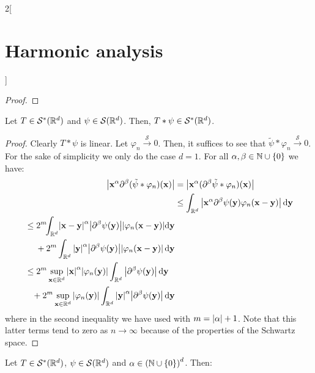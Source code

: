 \documentclass[../../../main_math.tex]{subfiles}
\begin{document}
\begin{multicols}{2}[\section{Harmonic analysis}]
\begin{proof}
  \end{proof}
  \begin{lemma}
    Let $T\in \mathcal{S}^*(\mathbb{R}^d)$ and $\psi\in \mathcal{S}(\mathbb{R}^d)$. Then, $T*\psi\in \mathcal{S}^*(\mathbb{R}^d)$.
  \end{lemma}
  \begin{proof}
    Clearly $T*\psi$ is linear. Let $\varphi_n\overset{\mathcal{S}}{\longrightarrow}0$. Then, it suffices to see that $\tilde\psi*\varphi_n\overset{\mathcal{S}}{\longrightarrow}0$. For the sake of simplicity we only do the case $d=1$. For all $\alpha,\beta\in{\ensuremath{\mathbb{N}}\cup\{0\}}$ we have:
    \begin{align*}
      \abs{\boldsymbol{\mathrm{x}}^\alpha \partial^\beta(\tilde\psi*\varphi_n)(\boldsymbol{\mathrm{x}})} & =\abs{\boldsymbol{\mathrm{x}}^\alpha (\partial^\beta\tilde\psi*\varphi_n)(\boldsymbol{\mathrm{x}})}                                                                 \\
                                                                       & \leq \int_{\mathbb{R}^d} \abs{\boldsymbol{\mathrm{x}}^\alpha \partial^\beta\psi(\boldsymbol{\mathrm{y}})\varphi_n(\boldsymbol{\mathrm{x}}-\boldsymbol{\mathrm{y}})}\dd{\boldsymbol{\mathrm{y}}}                               \\
      \begin{split}
        & \leq 2^m\!\!\int_{\mathbb{R}^d}\!\abs{\boldsymbol{\mathrm{x}}-\boldsymbol{\mathrm{y}}}^\alpha \abs{\partial^\beta\psi(\boldsymbol{\mathrm{y}})}\abs{\varphi_n(\boldsymbol{\mathrm{x}}-\boldsymbol{\mathrm{y}})}\!\dd{\boldsymbol{\mathrm{y}}} \\
        & \quad\;+2^m\int_{\mathbb{R}^d} \abs{\boldsymbol{\mathrm{y}}}^\alpha\abs{\partial^\beta\psi(\boldsymbol{\mathrm{y}})} \abs{\varphi_n(\boldsymbol{\mathrm{x}}-\boldsymbol{\mathrm{y}})}\dd{\boldsymbol{\mathrm{y}}}            \\
      \end{split} \\
      \begin{split}
        & \leq 2^m\sup_{\boldsymbol{\mathrm{x}}\in\mathbb{R}^d}\abs{\boldsymbol{\mathrm{x}}}^\alpha\abs{\varphi_n(\boldsymbol{\mathrm{y}})}\int_{\mathbb{R}^d}  \abs{\partial^\beta\psi(\boldsymbol{\mathrm{y}})}\dd{\boldsymbol{\mathrm{y}}}  \\
        & \;\;\;+2^m\sup_{\boldsymbol{\mathrm{x}}\in\mathbb{R}^d}\abs{\varphi_n(\boldsymbol{\mathrm{y}})}\int_{\mathbb{R}^d} \abs{\boldsymbol{\mathrm{y}}}^\alpha\abs{\partial^\beta\psi(\boldsymbol{\mathrm{y}})}\dd{\boldsymbol{\mathrm{y}}} \\
      \end{split}
    \end{align*}
    where in the second inequality we have used  with $m=\abs{\alpha}+1$. Note that this latter terms tend to zero as $n\to\infty$ because of the properties of the Schwartz space.
  \end{proof}
  \begin{lemma}
    Let $T\in \mathcal{S}^*(\mathbb{R}^d)$, $\psi\in \mathcal{S}(\mathbb{R}^d)$ and $\alpha\in{(\ensuremath{\mathbb{N}}\cup\{0\})}^d$. Then:

\end{lemma}
\end{multicols}
\end{document}
